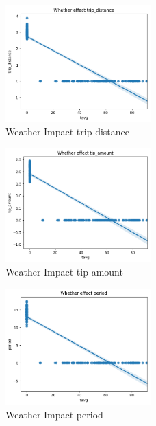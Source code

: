 \documentclass[11pt]{article}
\begin{document}
\begin{figure}[!h]
    \centering
    \includegraphics[width=0.5\textwidth]{plots/p5.png}
    \caption{Weather Impact trip distance} %
    \label{fig:image3}
\end{figure}

\begin{figure}[!h]
    \centering
    \includegraphics[width=0.5\textwidth]{plots/p6.png}
    \caption{Weather Impact tip amount} %
    \label{fig:image3}
\end{figure}


\begin{figure}[!h]
    \centering
    \includegraphics[width=0.5\textwidth]{plots/p7.png}
    \caption{Weather Impact period} %
    \label{fig:image3}
\end{figure}
\end{document}

